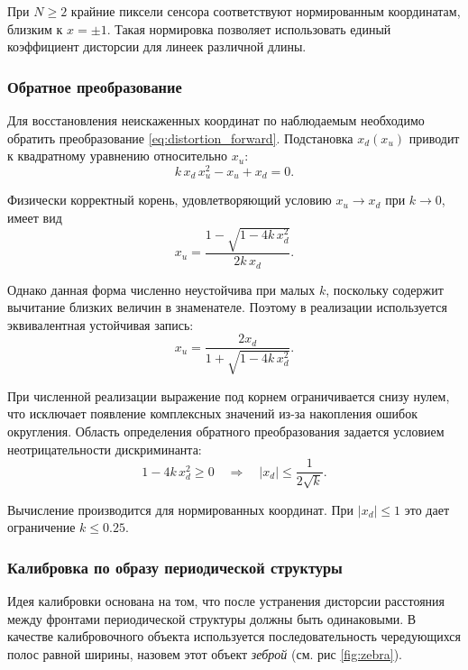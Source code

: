 При $N \geq 2$ крайние пиксели сенсора соответствуют нормированным координатам, близким к $x=\pm1$. Такая нормировка позволяет использовать единый коэффициент дисторсии для линеек различной длины.

\subsubsection{Обратное преобразование}

Для восстановления неискаженных координат по наблюдаемым необходимо обратить преобразование \eqref{eq:distortion_forward}. Подстановка $x_d(x_u)$ приводит к квадратному уравнению относительно $x_u$:
\begin{equation}
k\,x_d\,x_u^2 - x_u + x_d = 0.
\label{eq:distortion_quadratic}
\end{equation}

Физически корректный корень, удовлетворяющий условию $x_u \to x_d$ при $k \to 0$, имеет вид
\begin{equation}
x_u = \frac{1 - \sqrt{1 - 4k\,x_d^2}}{2k\,x_d}.
\label{eq:distortion_inverse_raw}
\end{equation}

Однако данная форма численно неустойчива при малых $k$, поскольку содержит вычитание близких величин в знаменателе. Поэтому в реализации используется эквивалентная устойчивая запись:
\begin{equation}
x_u = \frac{2x_d}{1 + \sqrt{1 - 4k\,x_d^2}}.
\label{eq:distortion_inverse_stable}
\end{equation}

При численной реализации выражение под корнем ограничивается снизу нулем, что исключает появление комплексных значений из-за накопления ошибок округления. Область определения обратного преобразования задается условием неотрицательности дискриминанта:
\begin{equation}
    1 - 4k\,x_d^2 \geq 0 \quad \Longrightarrow \quad |x_d| \leq \frac{1}{2\sqrt{k}}.
    \label{eq:distortion_domain}
\end{equation}

Вычисление производится для нормированных координат. При $|x_d| \leq 1$ это дает ограничение $k \leq 0.25$.

\subsubsection{Калибровка по образу периодической структуры}

Идея калибровки основана на том, что после устранения дисторсии расстояния между фронтами периодической структуры должны быть одинаковыми. В качестве калибровочного объекта используется последовательность чередующихся полос равной ширины, назовем этот объект \textit{зеброй} (см. рис \ref{fig:zebra}).

